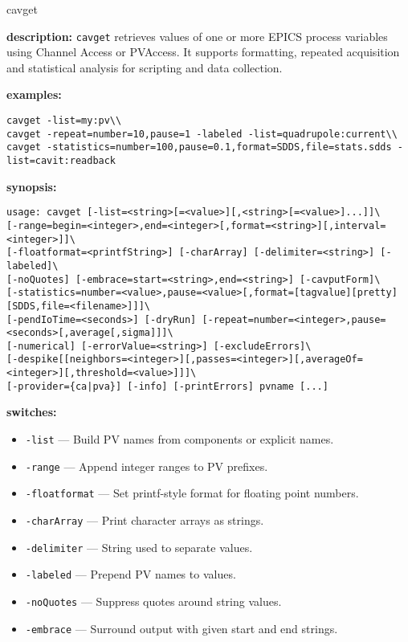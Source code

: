 %
%
\begin{sddsprog}{cavget}
\item \textbf{description:}
\verb+cavget+ retrieves values of one or more EPICS process variables using Channel Access or PVAccess.
It supports formatting, repeated acquisition and statistical analysis for scripting and data collection.
\item \textbf{examples:}
\begin{verbatim}
cavget -list=my:pv\\
cavget -repeat=number=10,pause=1 -labeled -list=quadrupole:current\\
cavget -statistics=number=100,pause=0.1,format=SDDS,file=stats.sdds -list=cavit:readback
\end{verbatim}
\item \textbf{synopsis:}
\begin{verbatim}
usage: cavget [-list=<string>[=<value>][,<string>[=<value>]...]]\
[-range=begin=<integer>,end=<integer>[,format=<string>][,interval=<integer>]]\
[-floatformat=<printfString>] [-charArray] [-delimiter=<string>] [-labeled]\
[-noQuotes] [-embrace=start=<string>,end=<string>] [-cavputForm]\
[-statistics=number=<value>,pause=<value>[,format=[tagvalue][pretty][SDDS,file=<filename>]]]\
[-pendIoTime=<seconds>] [-dryRun] [-repeat=number=<integer>,pause=<seconds>[,average[,sigma]]]\
[-numerical] [-errorValue=<string>] [-excludeErrors]\
[-despike[[neighbors=<integer>][,passes=<integer>][,averageOf=<integer>][,threshold=<value>]]]\
[-provider={ca|pva}] [-info] [-printErrors] pvname [...]
\end{verbatim}
\item \textbf{switches:}
\begin{itemize}
  \item {\tt -list} --- Build PV names from components or explicit names.
  \item {\tt -range} --- Append integer ranges to PV prefixes.
  \item {\tt -floatformat} --- Set printf-style format for floating point numbers.
  \item {\tt -charArray} --- Print character arrays as strings.
  \item {\tt -delimiter} --- String used to separate values.
  \item {\tt -labeled} --- Prepend PV names to values.
  \item {\tt -noQuotes} --- Suppress quotes around string values.
  \item {\tt -embrace} --- Surround output with given start and end strings.

\end{itemize}
\end{sddsprog}
